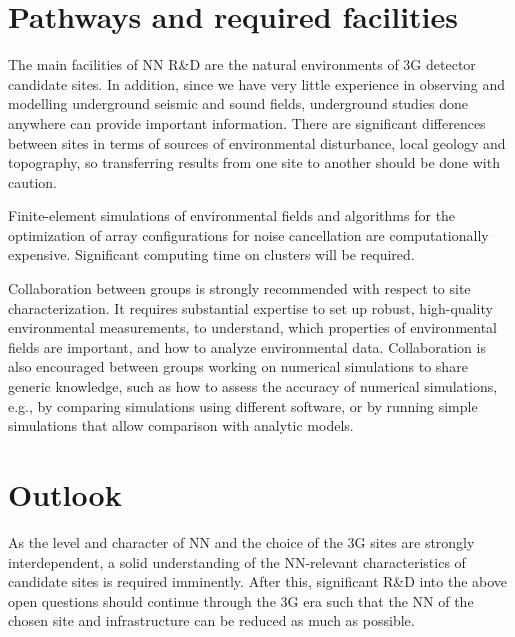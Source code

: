 \section{Pathways and required facilities}
The main facilities of NN R\&D are the natural environments of 3G detector candidate sites. In addition, since we have very little experience in observing and modelling underground seismic and sound fields, underground studies done anywhere can provide important information. There are significant differences between sites in terms of sources of environmental disturbance, local geology and topography, so transferring results from one site to another should be done with caution.

Finite-element simulations of environmental fields and algorithms for the optimization of array configurations for noise cancellation are computationally expensive. Significant computing time on clusters will be required. 

Collaboration between groups is strongly recommended with respect to site characterization. It requires substantial expertise to set up robust, high-quality environmental measurements, to understand, which properties of environmental fields are important, and how to analyze environmental data. Collaboration is also encouraged between groups working on numerical simulations to share generic knowledge, such as how to assess the accuracy of numerical simulations, e.g., by comparing simulations using different software, or by running simple simulations that allow comparison with analytic models.

\section{Outlook}

As the level and character of NN and the choice of the 3G sites are strongly interdependent, a solid understanding of the NN-relevant characteristics of candidate sites is required imminently. After this, significant R\&D into the above open questions should continue through the 3G era such that the NN of the chosen site and infrastructure can be reduced as much as possible.  

